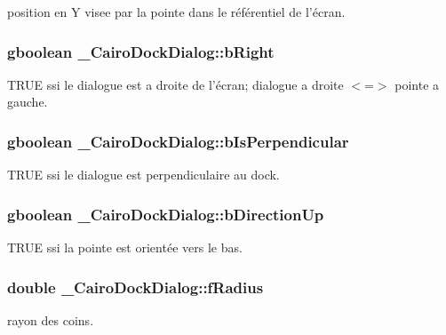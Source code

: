 position en Y visee par la pointe dans le référentiel de l'écran. 

\subsubsection{\setlength{\rightskip}{0pt plus 5cm}gboolean {\bf \_\-CairoDockDialog::bRight}}\label{struct__CairoDockDialog_cb17f2c9935774992dbf64861a1fad75}


TRUE ssi le dialogue est a droite de l'écran; dialogue a droite $<$=$>$ pointe a gauche. 

\subsubsection{\setlength{\rightskip}{0pt plus 5cm}gboolean {\bf \_\-CairoDockDialog::bIsPerpendicular}}\label{struct__CairoDockDialog_315dccb8eee698557644eb2e9167e60c}


TRUE ssi le dialogue est perpendiculaire au dock. 

\subsubsection{\setlength{\rightskip}{0pt plus 5cm}gboolean {\bf \_\-CairoDockDialog::bDirectionUp}}\label{struct__CairoDockDialog_0ed99034759804c53dc758f3d1de1791}


TRUE ssi la pointe est orientée vers le bas. 

\subsubsection{\setlength{\rightskip}{0pt plus 5cm}double {\bf \_\-CairoDockDialog::fRadius}}\label{struct__CairoDockDialog_4b66164db266683fbca41b8372b85d50}


rayon des coins. 

